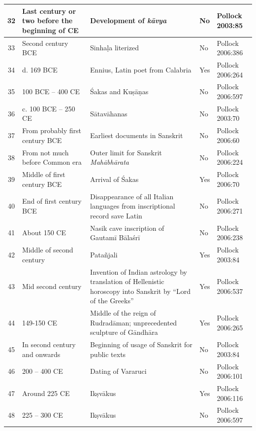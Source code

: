 \begin{longtable}{|c|p{1.9cm}|p{1.9cm}|p{1.5cm}|p{1.1cm}|}
\hline
32 & Last century or two before the beginning of CE & Development of \textit{kāvya}\index{kavya@\textit{kāvya}} & No & Pollock 2003:85 \\
\hline
33 & Second century BCE & Sinhaḷa literized & No & Pollock\index{Pollock, Sheldon} 2006:386 \\
\hline
34 & d. 169 BCE & Ennius, Latin poet from Calabria & Yes & Pollock 2006:264 \\
\hline
35 & 100 BCE – 400 CE & Śakas\index{Saka@Śaka}\index{Kusanas@Kuṣāṇas} and Kuṣāṇas & No & Pollock 2006:597 \\
\hline
36 & c. 100 BCE – 250 CE & Sātavāhanas\index{Satavahanas@Sātavāhanas} & No & Pollock 2003:70 \\
\hline
37 & From probably first century BCE & Earliest documents in Sanskrit & No & Pollock 2006:60 \\
\hline
38 & From not much before Common era & Outer limit for Sanskrit \textit{Mahābhārata}\index{Mahabharata@\textit{Mahābhārata}} & No & Pollock 2006:224 \\
\hline
39 & Middle of first century BCE & Arrival of Śakas\index{Saka@Śaka} & Yes & Pollock 2006:70 \\
\hline
40 & End of first century BCE & Disappearance of all Italian languages from inscriptional record save Latin & No & Pollock 2006:271 \\
\hline
41 & About 150 CE & Nasik cave inscription of Gautamī Bālaśrī & No & Pollock 2006:238 \\
\hline
42 & Middle of second century & Patañjali\index{Patanjali@Patañjali} & Yes & Pollock 2003:84 \\
\hline
43 & Mid second century & Invention of Indian astrology by translation of Hellenistic horoscopy into Sanskrit by “Lord of the Greeks” & Yes & Pollock\index{Pollock, Sheldon} 2006:537 \\
\hline
44 & 149-150 CE & Middle of the reign of Rudradāman;\index{Rudradaman@Rudradāman} unprecedented sculpture of Gāndhāra & Yes & Pollock 2006:265 \\
\hline
45 & In second century and onwards & Beginning of usage of Sanskrit for public texts & No & Pollock 2003:84 \\
\hline
46 & 200 – 400 CE & Dating of Vararuci\index{Vararuci} & No & Pollock 2006:101 \\
\hline
47 & Around 225 CE & Ikṣvākus\index{Iksvakus@Ikṣvākus} & Yes & Pollock 2006:116 \\
\hline
48 & 225 – 300 CE & Ikṣvākus & No & Pollock 2006:597 \\

\end{longtable}
